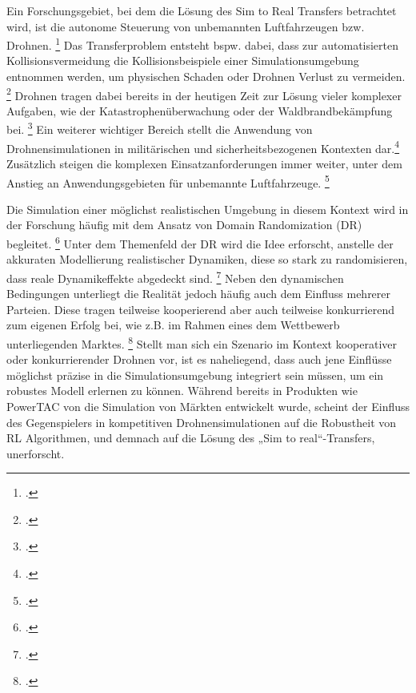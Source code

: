 Ein Forschungsgebiet, bei dem die Lösung des Sim to Real Transfers betrachtet wird, ist die autonome Steuerung von unbemannten Luftfahrzeugen bzw. Drohnen. \footcite[Vgl.][S. 1]{Deshpande.2021}
Das Transferproblem entsteht bspw. dabei, dass zur automatisierten Kollisionsvermeidung die Kollisionsbeispiele einer Simulationsumgebung entnommen werden, um physischen Schaden oder Drohnen Verlust zu vermeiden. \footcite[Vgl.][S. 4]{Sadeghi.2016}
Drohnen tragen dabei bereits in der heutigen Zeit zur Lösung vieler komplexer Aufgaben, wie der Katastrophenüberwachung oder der Waldbrandbekämpfung bei. \footcite[Vgl.][S. 1495]{Hentati.2018}
Ein weiterer wichtiger Bereich stellt die Anwendung von Drohnensimulationen in militärischen und sicherheitsbezogenen Kontexten dar.\footcite[Vgl.][S. 1]{9004907}
Zusätzlich steigen die komplexen Einsatzanforderungen immer weiter, unter dem Anstieg an Anwendungsgebieten für unbemannte Luftfahrzeuge. \footcite[Vgl.][S. 1]{Deshpande.2020}

Die Simulation einer möglichst realistischen Umgebung in diesem Kontext wird in der Forschung häufig mit dem Ansatz von Domain Randomization (DR) begleitet. \footcite[Vgl.][S. 1]{Sadeghi.2016}
Unter dem Themenfeld der DR wird die Idee erforscht, anstelle der akkuraten Modellierung realistischer Dynamiken, diese so stark zu randomisieren, dass reale Dynamikeffekte abgedeckt sind. \footcite[Vgl.][S. 4f.]{Zhao.2020}
Neben den dynamischen Bedingungen unterliegt die Realität jedoch häufig auch dem Einfluss mehrerer Parteien.
Diese tragen teilweise kooperierend aber auch teilweise konkurrierend zum eigenen Erfolg bei, wie z.B. im Rahmen eines dem Wettbewerb unterliegenden Marktes. \footcite[Vgl.][S. 2]{COLLINS2022101217}
Stellt man sich ein Szenario im Kontext kooperativer oder konkurrierender Drohnen vor, ist es naheliegend, dass auch jene Einflüsse möglichst präzise in die Simulationsumgebung integriert sein müssen, um ein robustes Modell erlernen zu können.
Während bereits in Produkten wie PowerTAC von \cite[][]{COLLINS2022101217} die Simulation von Märkten entwickelt wurde, scheint der Einfluss des Gegenspielers in kompetitiven Drohnensimulationen auf die Robustheit von RL Algorithmen, und demnach auf die Lösung des „Sim to real“-Transfers, unerforscht.